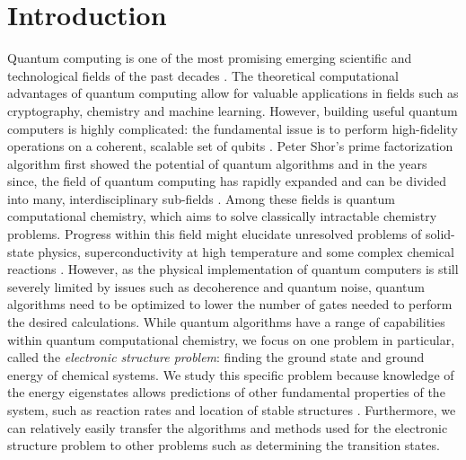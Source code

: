 \chapter{Introduction}

Quantum computing is one of the most promising emerging scientific and technological fields of the past decades \cite{McArdle}. The theoretical computational advantages of quantum computing allow for valuable applications in fields such as cryptography, chemistry and machine learning. However, building useful quantum computers is highly complicated: the fundamental issue is to perform high-fidelity operations on a coherent, scalable set of qubits \cite{malley}. Peter Shor's prime factorization algorithm first showed the potential of quantum algorithms and in the years since, the field of quantum computing has rapidly expanded and can be divided into many, interdisciplinary sub-fields \cite{shor}. Among these fields is quantum computational chemistry, which aims to solve classically intractable chemistry problems. Progress within this field might elucidate unresolved problems of solid-state physics, superconductivity at high temperature and some complex chemical reactions \cite{McArdle}. However, as the physical implementation of quantum computers is still severely limited by issues such as decoherence and quantum noise, quantum algorithms need to be optimized to lower the number of gates needed to perform the desired calculations. While quantum algorithms have a range of capabilities within quantum computational chemistry, we focus on one problem in particular, called the \textit{electronic structure problem}: finding the ground state and ground energy of chemical systems. We study this specific problem because knowledge of the energy eigenstates allows predictions of other fundamental properties of the system, such as reaction rates and location of stable structures \cite[p.~3]{McArdle}. Furthermore, we can relatively easily transfer the algorithms and methods used for the electronic structure problem to other problems such as determining the transition states. \\

\vspace{5mm}

